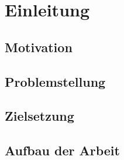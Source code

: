 \section{Einleitung} \label{sec:einleitung}


\subsection{Motivation} \label{sec:motivation}

\subsection{Problemstellung} \label{sec:problemstellung}

\subsection{Zielsetzung} \label{sec:zielsetzung}

\subsection{Aufbau der Arbeit} \label{sec:aufbauDerArbeit}